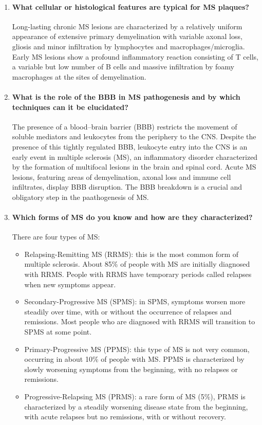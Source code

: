 \documentclass[12pt,article,oneside,a4paper]{memoir}
\begin{document}
\begin{enumerate}
\item \paragraph{What cellular or histological features are typical for MS
plaques?}

Long-lasting chronic MS lesions are characterized by a relatively uniform
appearance of extensive primary demyelination with variable axonal loss,
gliosis and minor infiltration by lymphocytes and macrophages/microglia. Early
MS lesions show a profound inflammatory reaction consisting of T cells, a
variable but low number of B cells and massive infiltration by foamy
macrophages at the sites of demyelination.


\item \paragraph{What is the role of the BBB in MS pathogenesis and by which
techniques can it be elucidated?}

The presence of a blood–brain barrier (BBB) restricts the movement of soluble
mediators and leukocytes from the periphery to the CNS. Despite the presence of
this tightly regulated BBB, leukocyte entry into the CNS is an early event in
multiple sclerosis (MS), an inflammatory disorder characterized by the
formation of multifocal lesions in the brain and spinal cord. Acute MS lesions,
featuring areas of demyelination, axonal loss and immune cell infiltrates,
display BBB disruption. The BBB breakdown is a crucial and obligatory step in 
the paathogenesis of MS.

\item \paragraph{Which forms of MS do you know and how are they characterized?}
There are four types of MS:
\begin{itemize}
\item Relapsing-Remitting MS (RRMS): this is the most common form of multiple
sclerosis. About 85\% of people with MS are initially diagnosed with RRMS.
People with RRMS have temporary periods called relapses when new symptoms
appear.
\item Secondary-Progressive MS (SPMS): in SPMS, symptoms worsen more steadily
over time, with or without the occurrence of relapses and remissions. Most
people who are diagnosed with RRMS will transition to SPMS at some point.
\item Primary-Progressive MS (PPMS): this type of MS is not very common,
occurring in about 10\% of people with MS. PPMS is characterized by slowly
worsening symptoms from the beginning, with no relapses or remissions.
\item Progressive-Relapsing MS (PRMS): a rare form of MS (5\%), PRMS is
characterized by a steadily worsening disease state from the beginning, with
acute relapses but no remissions, with or without recovery.
\end{itemize}


\end{enumerate}
\end{document}
